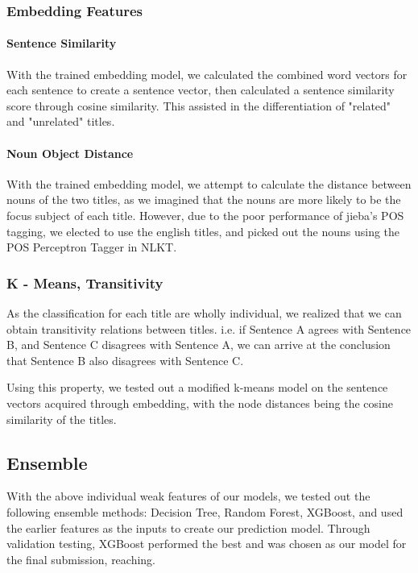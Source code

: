 \documentclass[a4paper, 12pt]{article}
\begin{document}
\begin{multicols}{2}
            \subsubsection{Embedding Features}
                \paragraph*{Sentence Similarity} With the trained embedding model, we calculated the combined word vectors for each sentence to create a sentence vector, then calculated a sentence similarity score through cosine similarity. This assisted in the differentiation of "related" and "unrelated" titles.

                \paragraph*{Noun Object Distance} With the trained embedding model, we attempt to calculate the distance between nouns of the two titles, as we imagined that the nouns are more likely to be the focus subject of each title. However, due to the poor performance of jieba's POS tagging, we elected to use the english titles, and picked out the nouns using the POS Perceptron Tagger in NLKT. \cite{percTag}

            \subsubsection{K - Means, Transitivity}
                As the classification for each title are wholly individual, we realized that we can obtain transitivity relations between titles. i.e. if Sentence A agrees with Sentence B, and Sentence C disagrees with Sentence A, we can arrive at the conclusion that Sentence B also disagrees with Sentence C. 
                
                Using this property, we tested out a modified k-means model on the sentence vectors acquired through embedding, with the node distances being the cosine similarity of the titles.

        \subsection{Ensemble}
            With the above individual weak features of our models, we tested out the following ensemble methods: Decision Tree, Random Forest, XGBoost, and used the earlier features as the inputs to create our prediction model. Through validation testing, XGBoost performed the best and was chosen as our model for the final submission, reaching.


\end{multicols}
\end{document}
